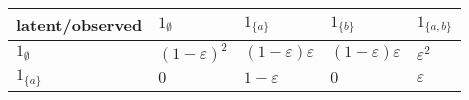 \documentclass[
]{article}
\begin{document}
\begin{longtable}[]{@{}lllll@{}}
\toprule
\begin{minipage}[b]{0.13\columnwidth}\raggedright
latent/observed\strut
\end{minipage} & \begin{minipage}[b]{0.16\columnwidth}\raggedright
\(1_\emptyset\)\strut
\end{minipage} & \begin{minipage}[b]{0.22\columnwidth}\raggedright
\(1_{\{a\}}\)\strut
\end{minipage} & \begin{minipage}[b]{0.22\columnwidth}\raggedright
\(1_{\{b\}}\)\strut
\end{minipage} & \begin{minipage}[b]{0.13\columnwidth}\raggedright
\(1_{\{a,b\}}\)\strut
\end{minipage}\tabularnewline
\midrule
\endhead
\begin{minipage}[t]{0.13\columnwidth}\raggedright
\(1_\emptyset\)\strut
\end{minipage} & \begin{minipage}[t]{0.16\columnwidth}\raggedright
\((1-\varepsilon)^2\)\strut
\end{minipage} & \begin{minipage}[t]{0.22\columnwidth}\raggedright
\((1-\varepsilon)\varepsilon\)\strut
\end{minipage} & \begin{minipage}[t]{0.22\columnwidth}\raggedright
\((1-\varepsilon)\varepsilon\)\strut
\end{minipage} & \begin{minipage}[t]{0.13\columnwidth}\raggedright
\(\varepsilon^2\)\strut
\end{minipage}\tabularnewline
\begin{minipage}[t]{0.13\columnwidth}\raggedright
\(1_{\{a\}}\)\strut
\end{minipage} & \begin{minipage}[t]{0.16\columnwidth}\raggedright
\(0\)\strut
\end{minipage} & \begin{minipage}[t]{0.22\columnwidth}\raggedright
\(1-\varepsilon\)\strut
\end{minipage} & \begin{minipage}[t]{0.22\columnwidth}\raggedright
\(0\)\strut
\end{minipage} & \begin{minipage}[t]{0.13\columnwidth}\raggedright
\(\varepsilon\)\strut

\end{minipage}
\end{longtable}
\end{document}
